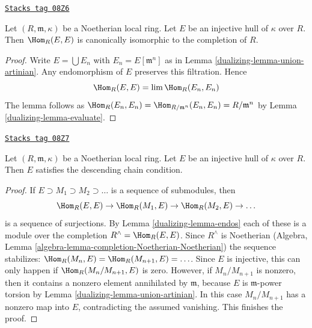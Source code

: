 \begin{lemma}[Endos]
\label{dualizing-lemma-endos}
\href{https://stacks.math.columbia.edu/tag/08Z6}{\texttt{Stacks tag 08Z6}}

Let $(R, \mathfrak m, \kappa)$ be a Noetherian local ring.
Let $E$ be an injective hull of $\kappa$ over $R$. Then
$\Hom_R(E, E)$ is canonically isomorphic to the completion of $R$.
\end{lemma}

\begin{proof}

Write $E = \bigcup E_n$ with $E_n = E[\mathfrak m^n]$ as in
Lemma \ref{dualizing-lemma-union-artinian}. Any endomorphism of $E$
preserves this filtration. Hence
$$
\Hom_R(E, E) = \lim \Hom_R(E_n, E_n)
$$
The lemma follows as
$\Hom_R(E_n, E_n) = \Hom_{R/\mathfrak m^n}(E_n, E_n) = R/\mathfrak m^n$
by Lemma \ref{dualizing-lemma-evaluate}.
\end{proof}

\begin{lemma}
\label{dualizing-lemma-injective-hull-has-dcc}
\href{https://stacks.math.columbia.edu/tag/08Z7}{\texttt{Stacks tag 08Z7}}

Let $(R, \mathfrak m, \kappa)$ be a Noetherian local ring.
Let $E$ be an injective hull of $\kappa$ over $R$. Then
$E$ satisfies the descending chain condition.
\end{lemma}

\begin{proof}

If $E \supset M_1 \supset M_2 \supset \ldots$ is a sequence of submodules, then
$$
\Hom_R(E, E) \to \Hom_R(M_1, E) \to \Hom_R(M_2, E) \to \ldots
$$
is a sequence of surjections. By Lemma \ref{dualizing-lemma-endos} each of these is a
module over the completion $R^\wedge = \Hom_R(E, E)$.
Since $R^\wedge$ is Noetherian
(Algebra, Lemma \ref{algebra-lemma-completion-Noetherian-Noetherian})
the sequence stabilizes: $\Hom_R(M_n, E) = \Hom_R(M_{n + 1}, E) = \ldots$.
Since $E$ is injective, this can only happen if $\Hom_R(M_n/M_{n + 1}, E)$
is zero. However, if $M_n/M_{n + 1}$ is nonzero, then it contains a
nonzero element annihilated by $\mathfrak m$, because $E$ is
$\mathfrak m$-power torsion by Lemma \ref{dualizing-lemma-union-artinian}.
In this case $M_n/M_{n + 1}$ has a nonzero map into $E$, contradicting
the assumed vanishing. This finishes the proof.
\end{proof}

